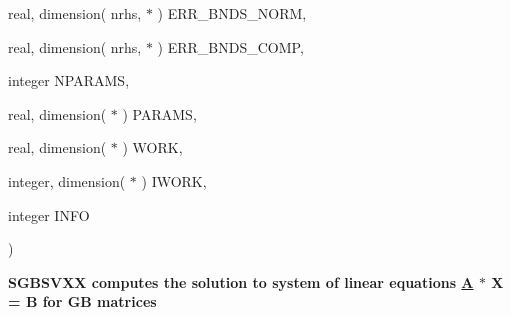 {\begin{DoxyParamCaption}
\item[{real, dimension( nrhs, $\ast$ )}]{E\+R\+R\+\_\+\+B\+N\+D\+S\+\_\+\+N\+O\+R\+M, }
\item[{real, dimension( nrhs, $\ast$ )}]{E\+R\+R\+\_\+\+B\+N\+D\+S\+\_\+\+C\+O\+M\+P, }
\item[{integer}]{N\+P\+A\+R\+A\+M\+S, }
\item[{real, dimension( $\ast$ )}]{P\+A\+R\+A\+M\+S, }
\item[{real, dimension( $\ast$ )}]{W\+O\+R\+K, }
\item[{integer, dimension( $\ast$ )}]{I\+W\+O\+R\+K, }
\item[{integer}]{I\+N\+F\+O}
\end{DoxyParamCaption}
)}\label{group__realGBsolve_gab7b2d018021516f6f0b0f4f6199f32ae}


{\bfseries  S\+G\+B\+S\+V\+X\+X computes the solution to system of linear equations \hyperlink{classA}{A} $\ast$ X = B for G\+B matrices} 

